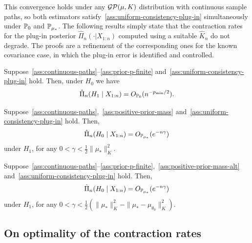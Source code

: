 This convergence holds under any \(\operatorname{\mathcal{GP}}(\mu, K)\) distribution with continuous sample paths, so both estimators satisfy~\ref{ass:uniform-consistency-plug-in} simultaneously under \(\mathbb{P}_0\) and \(\mathbb{P}_{\mu_*}\). The following results simply state that the contraction rates for the plug-in posterior \(\hat \Pi_n(\cdot|X_{1:n})\) computed using a suitable \(\hat K_n\) do not degrade. The proofs are a refinement of the corresponding ones for the known covariance case, in which the plug-in error is identified and controlled. 

\begin{theorem}\label{th:consistency-rates-h0-plugin}
  Suppose~\ref{ass:continuous-paths}--\ref{ass:prior-p-finite} and~\ref{ass:uniform-consistency-plug-in} hold. Then, under \(H_0\) we have
  \[
    \hat \Pi_n(H_1\mid X_{1:n}) = O_{\mathbb{P}_0}(n^{-p_{\min}/2}).
  \]
\end{theorem}

\begin{theorem}\label{th:consistency-rates-h1-plugin-1}
  Suppose~\ref{ass:continuous-paths},~\ref{ass:positive-prior-mass} and~\ref{ass:uniform-consistency-plug-in} hold. Then,
  \[
    \hat \Pi_n(H_0\mid X_{1:n}) = O_{\mathbb{P}_{\mu_*}}(e^{-n\gamma})
  \]
  under \(H_1\), for any \(0<\gamma<\frac{1}{2}\|\mu_*\|_K^2\).
\end{theorem}

\begin{theorem}\label{th:consistency-rates-h1-plugin-2}
  Suppose~\ref{ass:continuous-paths}--\ref{ass:prior-p-finite},~\ref{ass:positive-prior-mass-alt} and~\ref{ass:uniform-consistency-plug-in} hold. Then,
  \[
    \hat \Pi_n(H_0\mid X_{1:n}) = O_{\mathbb{P}_{\mu_*}}(e^{-n\gamma})
  \]
   under \(H_1\), for any \(0<\gamma<\frac{1}{2}(\|\mu_*\|_K^2 - \|\mu_* - \mu_{\theta_0}\|_K^2)\).
\end{theorem}

\subsection{On optimality of the contraction rates}\label{sec:optimality}

